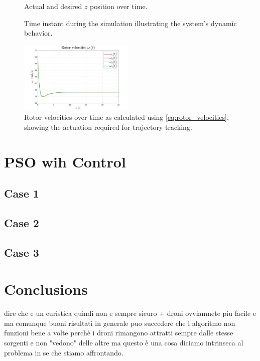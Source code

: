 \begin{figure}[h!]
\begin{minipage}[b]{0.49\textwidth}
        \caption[Tracking in Z-axis]{Actual and desired $z$ position over time.}
        \label{fig:pid_z}
    \end{minipage}
\end{figure}

\begin{figure}[h!]
    \centering
    \caption[Simulation Overview]{Time instant during the simulation illustrating the system's dynamic behavior.}
    \label{fig:pid_sim}
\end{figure}

\begin{figure}[h!]
    \centering
    \includegraphics[width=0.49\textwidth]{images/rotor_velocities.png}
    \caption[Rotor Velocities]{Rotor velocities over time as calculated using \eqref{eq:rotor_velocities}, showing the actuation required for trajectory tracking.}
    \label{fig:rotor_velocities}
\end{figure}

\section{PSO wih Control}
\subsection{Case 1}
\subsection{Case 2}
\subsection{Case 3}

\section{Conclusions}
dire che e un euristica quindi non e sempre sicuro
+ droni ovviamnete piu facile e 
ma comunque buoni risultati in generale 
puo succedere che l algoritmo non funzioni bene a volte 
perchè i droni rimangono
attratti sempre dalle stesse sorgenti e non 
"vedono" delle altre ma questo è una cosa diciamo 
intrinseca al problema in se che stiamo affrontando.